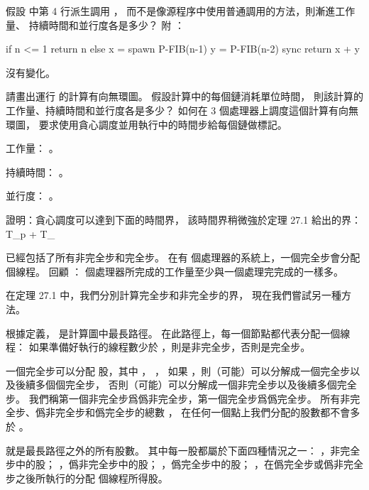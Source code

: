 
\startsection[
  title={The basics of dynamic multithreading},
  reference={section:27.1},
]

\startEXERCISE
假設  中第 4 行派生調用 ，
而不是像源程序中使用普通調用的方法，則漸進工作量、
持續時間和並行度各是多少？
附 ：

\startCLRS
if n <= 1
	return n
else
	x = spawn P-FIB(n-1)
	y = P-FIB(n-2)
	sync
	return x + y
\stopCLRS
\stopEXERCISE

\startANSWER
沒有變化。
\stopANSWER

\startEXERCISE
請畫出運行  的計算有向無環圖。
假設計算中的每個鏈消耗單位時間，
則該計算的工作量、持續時間和並行度各是多少？
如何在 3 個處理器上調度這個計算有向無環圖，
要求使用貪心調度並用執行中的時間步給每個鏈做標記。
\stopEXERCISE

\startANSWER
工作量： 。

持續時間： 。

並行度： 。

\externalfigure[output/e27_1_2-1][factor=fit]
\stopANSWER

\startEXERCISE[exercise:27.1-3]
證明：貪心調度可以達到下面的時間界，
該時間界稍微強於定理 27.1 給出的界：
\startformula
T_p \le {} + T_{\infty}
\stopformula
\stopEXERCISE

\startANSWER
{} 已經包括了所有非完全步和完全步。
在有  個處理器的系統上，一個完全步會分配  個線程。
回顧 ：  個處理器所完成的工作量至少與一個處理完完成的一樣多。

在定理 27.1 中，我們分別計算完全步和非完全步的界，
現在我們嘗試另一種方法。

根據定義，  是計算圖中最長路徑。
在此路徑上，每一個節點都代表分配一個線程：
如果準備好執行的線程數少於 ，則是非完全步，否則是完全步。

一個完全步可以分配  股，其中 ， ，
如果 ，則（可能）可以分解成一個完全步以及後續多個個完全步，
否則（可能）可以分解成一個非完全步以及後續多個完全步。
我們稱第一個非完全步爲{\EMP 僞}非完全步，第一個完全步爲{\EMP 僞}完全步。
所有非完全步、僞非完全步和僞完全步的總數 ，
在任何一個點上我們分配的股數都不會多於 。

 就是最長路徑之外的所有股數。
其中每一股都屬於下面四種情況之一：
 ，非完全步中的股；
 ，僞非完全步中的股；
 ，僞完全步中的股；
 ，在僞完全步或僞非完全步之後所執行的分配  個線程所得股。

